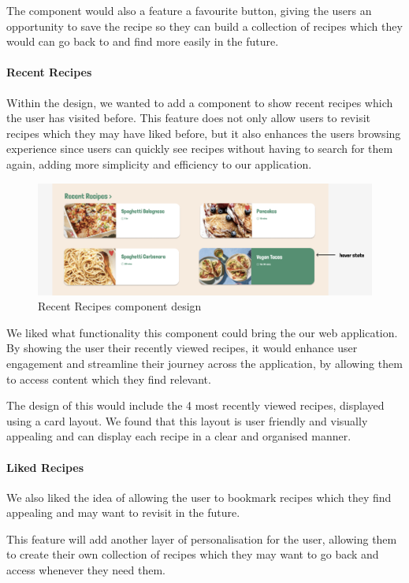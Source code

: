 \documentclass{article}
\begin{document}
The component would also a feature a favourite button, giving the users an
opportunity to save the recipe so they can build a collection of recipes which
they would can go back to and find more easily in the future.

\paragraph{Recent Recipes}
Within the design, we wanted to add a component to show recent recipes which
the user has visited before. This feature does not only allow users to revisit
recipes which they may have liked before, but it also enhances the users
browsing experience since users can quickly see recipes without having to
search for them again, adding more simplicity and efficiency to our
application.

\begin{figure}[h]
  \includegraphics[width=1.0\textwidth]{assets/design-images/Version 1 Recent Recipes.png}
  \centering
  \caption{Recent Recipes component design}
\end{figure}

We liked what functionality this component could bring the our web application.
By showing the user their recently viewed recipes, it would enhance user
engagement and streamline their journey across the application, by allowing
them to access content which they find relevant.

The design of this would include the 4 most recently viewed recipes, displayed
using a card layout. We found that this layout is user friendly and visually
appealing and can display each recipe in a clear and organised manner.

\paragraph{Liked Recipes}
We also liked the idea of allowing the user to bookmark recipes which they find
appealing and may want to revisit in the future.

This feature will add another layer of personalisation for the user, allowing
them to create their own collection of recipes which they may want to go back
and access whenever they need them.
\end{document}
